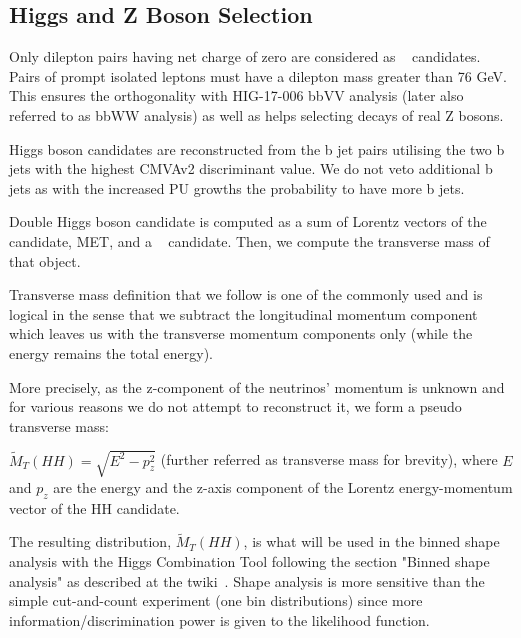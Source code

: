 \subsection{Higgs and Z Boson Selection}

Only dilepton pairs having net charge of zero are considered as \ZtoLL~ candidates. 
Pairs of prompt isolated leptons must have a dilepton mass greater than 76 GeV. This ensures the orthogonality with HIG-17-006 bbVV analysis (later also referred to as bbWW analysis) as well as helps selecting decays of real Z bosons.

Higgs boson candidates are reconstructed from the b jet pairs utilising the two b jets with the highest CMVAv2 discriminant value. We do not veto additional b jets as with the increased PU growths the probability to have more b jets. 

Double Higgs boson candidate is computed as a sum of Lorentz vectors of the \ZtoLL~ candidate, MET, and a \HBB~ candidate. Then, we compute the transverse mass of that object. 

Transverse mass definition that we follow is one of the commonly used and is logical in the sense that we subtract the longitudinal momentum component which leaves us with the transverse momentum components only (while the energy remains the total energy).

More precisely, as the z-component of the neutrinos' momentum is unknown and for various reasons we do not attempt to reconstruct it, we form a pseudo transverse mass:

                                                                                                                                                                       

\noindent $\tilde{M}_T(HH) = \sqrt{E^2 - p_{z}^2}$ (further referred as transverse mass for brevity), where $E$ and $p_z$ are the energy and the z-axis component of the Lorentz energy-momentum vector of the HH candidate.

The resulting distribution, $\tilde{M}_T(HH)$, is what will be used in the binned shape analysis with the Higgs Combination Tool following the section "Binned shape analysis" as described at the twiki~\cite{CombinedLimit}. Shape analysis is more sensitive than the simple cut-and-count experiment (one bin distributions) since more information/discrimination power is given to the likelihood function. 

